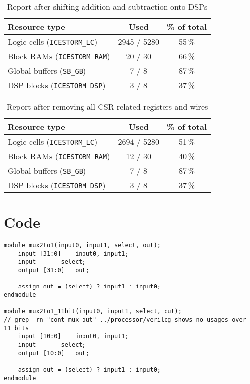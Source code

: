 \documentclass[a4paper,10pt]{article}
\begin{document}
\begin{table}[H] 
    \centering
    \begin{tabularx}{0.65\textwidth}{X c c}
        \toprule
        Resource type & Used & \% of total \\ \midrule
        Logic cells (\texttt{ICESTORM\_LC}) & 2945 / 5280 & 55\,\% \\
        Block RAMs (\texttt{ICESTORM\_RAM}) & 20 / 30 & 66\,\% \\
        Global buffers (\texttt{SB\_GB}) & 7 / 8 & 87\,\% \\
        DSP blocks (\texttt{ICESTORM\_DSP}) & 3 / 8 & 37\,\% \\
        \bottomrule
    \end{tabularx}
    \caption{Report after shifting addition and subtraction onto DSPs}
    \label{tab:DSP}
\end{table}

\begin{table}[H] 
    \centering
    \begin{tabularx}{0.65\textwidth}{X c c}
        \toprule
        Resource type & Used & \% of total \\ \midrule
        Logic cells (\texttt{ICESTORM\_LC}) & 2694 / 5280 & 51\,\% \\
        Block RAMs (\texttt{ICESTORM\_RAM}) & 12 / 30 & 40\,\% \\
        Global buffers (\texttt{SB\_GB}) & 7 / 8 & 87\,\% \\
        DSP blocks (\texttt{ICESTORM\_DSP}) & 3 / 8 & 37\,\% \\
        \bottomrule
    \end{tabularx}
    \caption{Report after removing all CSR related registers and wires}
    \label{tab:CSR}
\end{table}

\section{Code}

\begin{lstlisting}[style=verilog-style, caption=
    {Fixed-width 11-bit multiplexer}, label={prog:mux_11bit}]
module mux2to1(input0, input1, select, out);
	input [31:0]	input0, input1;
	input		select;
	output [31:0]	out;

	assign out = (select) ? input1 : input0;
endmodule

module mux2to1_11bit(input0, input1, select, out); 
// grep -rn "cont_mux_out" ../processor/verilog shows no usages over 11 bits
	input [10:0]	input0, input1;
	input		select;
	output [10:0]	out;

	assign out = (select) ? input1 : input0;
endmodule
\end{lstlisting}
\end{document}
